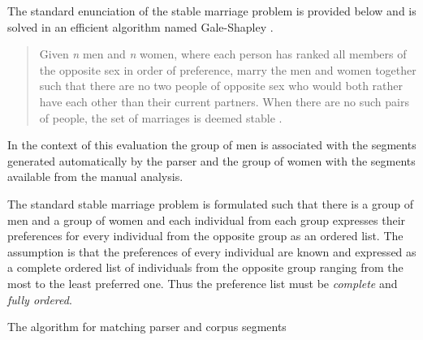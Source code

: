     The standard enunciation of the stable marriage problem is provided below and is solved in an efficient algorithm named Gale-Shapley \citep{Gale1962}.
    
    \begin{quotation}
        Given \textit{n} men and \textit{n} women, where each person has ranked all members of the opposite sex in order of preference, marry the men and women together such that there are no two people of opposite sex who would both rather have each other than their current partners. When there are no such pairs of people, the set of marriages is deemed stable \citep{iwama2008}.
    \end{quotation}

    In the context of this evaluation the group of men is associated with the segments generated automatically by the parser and the group of women with the segments available from the manual analysis. 

    The standard stable marriage problem is formulated such that there is a group of men and a group of women and each individual from each group expresses their preferences for every individual from the opposite group as an ordered list. The assumption is that the preferences of every individual are known and expressed as a complete ordered list of individuals from the opposite group ranging from the most to the least preferred one. Thus the preference list must be \textit{complete} and \textit{fully ordered}. 

    \begin{algorithm}[!ht]\small
        \Input{\aslist, \mslist} %
        \caption{The algorithm for matching parser and corpus segments}
        \label{alg:matching}
    \end{algorithm}

